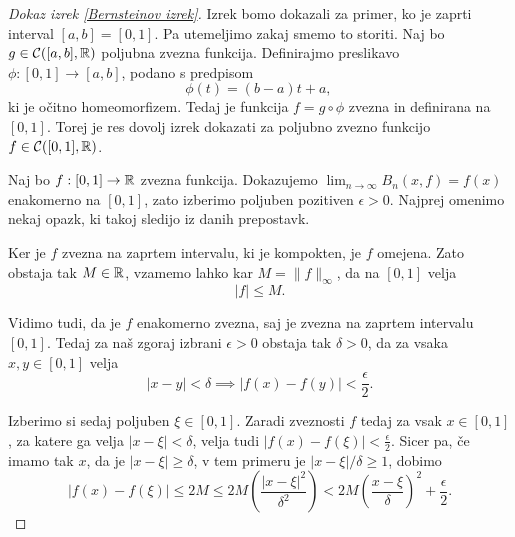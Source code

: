 \documentclass[a4paper, reqno]{amsart}
\theoremstyle{theorem}
\theoremstyle{definition}
\begin{document}
\begin{proof}[Dokaz \emph{izrek \ref{Bernsteinov izrek}}]


\par
Izrek bomo dokazali za primer, ko je zaprti interval $[a,b] = [0,1]$. Pa utemeljimo
zakaj smemo to storiti. Naj bo $g \in \mathcal{C}([a,b],\mathbb{R})$ poljubna zvezna funkcija. 
Definirajmo preslikavo $\phi: [0,1] \to [a,b]$, podano s predpisom
$$ \phi(t) = (b - a)t + a \text{, }$$
ki je očitno homeomorfizem. Tedaj je funkcija $f = g \circ \phi$ zvezna in definirana
na $[0,1]$. Torej je res dovolj izrek dokazati za poljubno zvezno funkcijo $f \in \mathcal{C}([0,1],\mathbb{R})$. 

\par
Naj bo $f : [0,1] \to \mathbb{R}$ zvezna funkcija. Dokazujemo $\lim_{n\to\infty}B_n(x, f) = f(x)$
enakomerno na $[0,1]$, zato izberimo poljuben pozitiven $\epsilon > 0$. Najprej
omenimo nekaj opazk, ki takoj sledijo iz danih prepostavk.

\par
Ker je $f$ zvezna na zaprtem intervalu, ki je kompokten, je $f$ omejena. %
Zato obstaja tak $M \in \mathbb{R}$, vzamemo lahko kar $M = \|f\|_{\infty}$, da na $[0,1]$ velja
$$ |f| \leq M \text{.}$$
\par
Vidimo tudi, da je $f$ enakomerno zvezna, saj je zvezna na zaprtem intervalu $[0,1]$.
Tedaj za naš zgoraj izbrani $\epsilon > 0$ obstaja tak $\delta > 0$, da za vsaka 
$x, y \in [0,1]$ velja
\begin{equation}
	\label{eq:enak.zv.}
	|x - y| < \delta \implies |f(x) - f(y)| < \frac{\epsilon}{2}\text{.}
\end{equation}

\par
Izberimo si sedaj poljuben $\xi \in [0,1]$. Zaradi zveznosti $f$ tedaj za vsak
$x \in [0,1]$, za katere ga velja $|x - \xi| < \delta$, velja tudi 
$|f(x) - f(\xi)| < \frac{\epsilon}{2}$. Sicer pa, če imamo tak $x$, da je
$|x - \xi| \geq \delta$, v tem primeru je $|x - \xi|/\delta \geq 1$, dobimo
\begin{equation}
	\label{eq:druga moznost}
	|f(x) - f(\xi)| \leq 2M \leq 2M\left(\frac{|x - \xi|^2}{\delta^2}\right) <
	2M\left(\frac{x - \xi}{\delta}\right)^2 + \frac{\epsilon}{2}\text{.}
\end{equation}


\end{proof}
\end{document}
